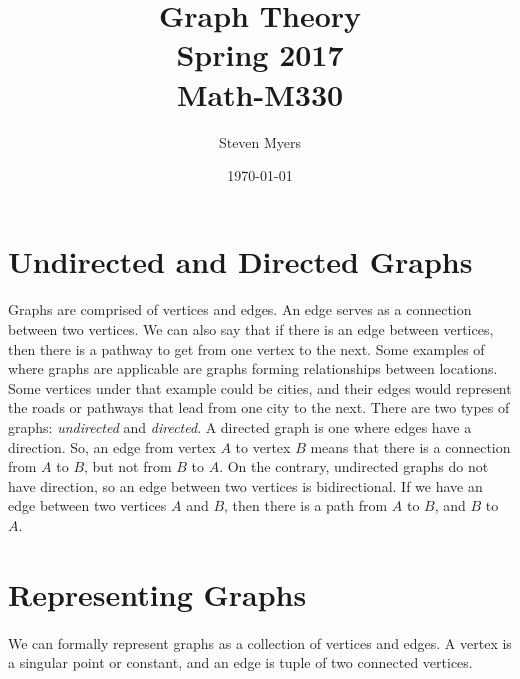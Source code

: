 \documentclass{article}
\begin{document}
\title{Graph Theory\\ Spring 2017\\ Math-M330}         %
\author{Steven Myers}        %
\date{\today}          %
\maketitle


\makeatother     %

\pagestyle{plain}

\section*{Undirected and Directed Graphs}

\paragraph{}
Graphs are comprised of vertices and edges. An edge serves as a connection between two vertices. We can also say that if there is an edge between vertices, then there is a pathway to get from one vertex to the next. Some examples of where graphs are applicable are graphs forming relationships between locations. Some vertices under that example could be cities, and their edges would represent the roads or pathways that lead from one city to the next. There are two types of graphs: \textit{undirected} and \textit{directed}. A directed graph is one where edges have a direction. So, an edge from vertex $A$ to vertex $B$ means that there is a connection from $A$ to $B$, but not from $B$ to $A$. On the contrary, undirected graphs do not have direction, so an edge between two vertices is bidirectional. If we have an edge between two vertices $A$ and $B$, then there is a path from $A$ to $B$, and $B$ to $A$.

\section*{Representing Graphs}
\paragraph{}
We can formally represent graphs as a collection of vertices and edges. A vertex is a singular point or constant, and an edge is tuple of two connected vertices.
\end{document}

